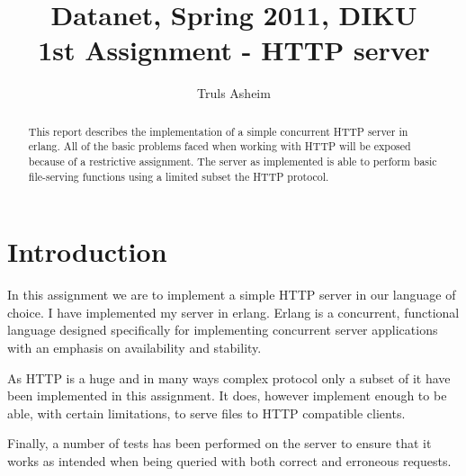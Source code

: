\documentclass{sig-alternate}
\begin{document}
\title{Datanet, Spring 2011, DIKU\\1st Assignment - HTTP server}


\author{
\alignauthor
Truls Asheim\\
}

\maketitle

\begin{abstract}

%
%
  This report describes the implementation of a simple concurrent HTTP
  server in erlang. All of the basic problems faced when working with
  HTTP will be exposed because of a restrictive assignment. The
  server as implemented is able to perform basic file-serving functions
  using a limited subset the HTTP protocol.

\end{abstract}

%
%
\section{Introduction}

In this assignment we are to implement a simple HTTP server in our
language of choice. I have implemented my server in erlang. Erlang is
a concurrent, functional language designed specifically for
implementing concurrent server applications with an emphasis on
availability and stability.

As HTTP is a huge and in many ways complex protocol only a subset of
it have been implemented in this assignment. It does, however 
implement enough to be able, with certain limitations, to serve files
to HTTP compatible clients.  

Finally, a number of tests has been performed on the server to
ensure that it works as intended when being queried with both correct
and erroneous requests.
\end{document}
